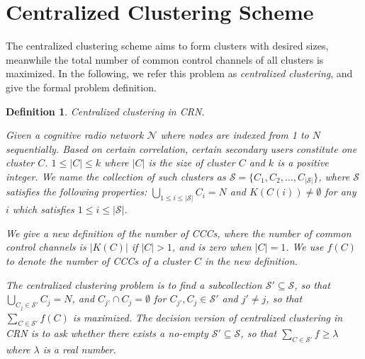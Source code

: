 \documentclass[10pt,journal,compsoc]{IEEEtran}
\theoremstyle{mytheoremstyle}
\theoremstyle{mytheoremstyle}
\theoremstyle{mytheoremstyle}
\newtheorem{mydef}{Definition}%
\begin{document}
\section{Centralized Clustering Scheme}
\label{centralized_scheme}



The centralized clustering scheme aims to form clusters with desired sizes, meanwhile the total number of common control channels of all clusters is maximized.
In the following, we refer this problem as \textit{centralized clustering}, and give the formal problem definition. 


\begin{mydef}
\label{def_centralized_clustering}
\textit{Centralized clustering in CRN.}

Given a cognitive radio network $\mathcal{N}$ where nodes are indexed from 1 to $N$ sequentially.
Based on certain correlation, certain secondary users constitute one cluster $C$.
$1\leq |C| \leqslant k$ where $|C|$ is the size of cluster $C$ and $k$ is a positive integer.
We name the collection of such clusters as $\mathcal{S}=\{C_1, C_2,\ldots,C_{|\mathcal{S}|}\}$, where $\mathcal{S}$ satisfies the following properties: $\bigcup_{1\leq i \leq |\mathcal{S}|} C_i = N$ and $K(C(i))\neq \emptyset$ for any $i$ which satisfies $1\leq i \leq |\mathcal{S}|$.

We give a new definition of the number of CCCs, where the number of common control channels is $|K(C)|$ if $|C|>1$, and is zero when $|C|=1$.
We use $f(C)$ to denote the number of CCCs of a cluster $C$ in the new definition.

The centralized clustering problem is to find a subcollection $\mathcal{S}' \subseteq \mathcal{S}$, so that $\bigcup_{C_j\in \mathcal{S}'} C_j = N$, and $C_{j'}\cap C_j =\emptyset$ for $C_{j'}, C_j\in \mathcal{S}'$ and $j'\neq j$, so that $\sum_{C\in \mathcal{S}'} f(C)$ is maximized.
The decision version of centralized clustering in CRN is to ask whether there exists a no-empty $\mathcal{S}'\subseteq \mathcal{S}$, so that $\sum_{C\in \mathcal{S}'} f \geqslant \lambda$ where $\lambda$ is a real number.%
\end{mydef}
\end{document}

